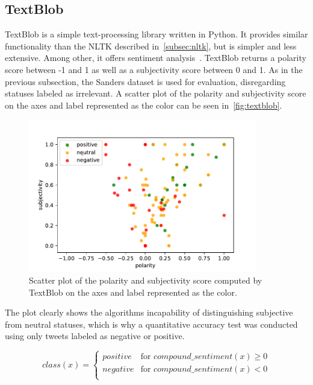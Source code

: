 \subsection{TextBlob}
\label{subsec:textblob}

TextBlob is a simple text-processing library written in Python.
It provides similar functionality than the NLTK described in~\autoref{subsec:nltk},
but is simpler and less extensive.
Among other, it offers sentiment analysis~\cite{textblobDocs}.
TextBlob returns a polarity score between -1 and 1 as well as a subjectivity score between 0 and 1.
As in the previous subsection, the Sanders dataset is used for evaluation, disregarding statuses labeled as irrelevant.
A scatter plot of the polarity and subjectivity score on the axes and label represented as the color can be seen in~\autoref{fig:textblob}.

\begin{figure}
    \centering
    \caption{Scatter plot of the polarity and subjectivity score computed by TextBlob on the axes and label represented as the color.}
    \label{fig:textblob}
    \includegraphics[width=10cm]{../figures/textblob.pdf}
\end{figure}

The plot clearly shows the algorithms incapability of distinguishing subjective from neutral statuses,
which is why a quantitative accuracy test was conducted using only tweets labeled as negative or positive.

\begin{equation}
    class(x) =
    \begin{cases}
        positive & \text{for } compound\_sentiment(x) \geq 0 \\
        negative & \text{for } compound\_sentiment(x) < 0\\
    \end{cases}
\end{equation}

